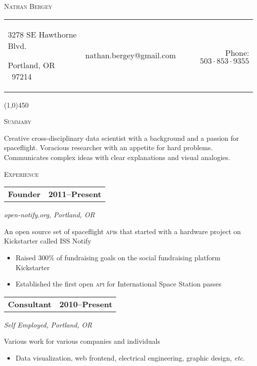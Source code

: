 \documentclass[letterpaper,10pt]{article}
\makeatletter
\newcommand{\me}      {Nathan Bergey}
\newcommand{\email}   {nathan.bergey@gmail.com}
\newcommand{\address} {\begin{minipage}{2in}\raggedright3278 SE Hawthorne Blvd.\par Portland, OR \ 97214\end{minipage}}
\newcommand{\phone}   {$503\cdot853\cdot9355$}
\newcommand{\resumepageheader}{
  \begin{center}
    {\LARGE{\textsc{\me}}}

    \vspace{0.2in}

    \begin{tabular*}{6.5in}{l c@{\extracolsep{\fill}} r}
      \address & \email & Phone: \phone \\
    \end{tabular*}
    
    \vspace{0.02in}

    \line(1,0){450}
  \end{center}
}
\newcommand{\resumestatement}[1]{
  \vspace{0.05in}
  \textsc{\Large Summary}
  \vspace{0.1in}
  \begin{center}
    \begin{minipage}{5.5in}
      \small
      #1
    \end{minipage}
  \end{center}
}
\newcommand{\resumeheader}[1]{
  \vspace{0.08in}
  \textsc{\Large #1}
  \vspace{0.10in}
}
\newcommand{\resumeitem}[4]{
  {\addtolength{\leftskip}{0.21in}
    \begin{tabular*}{6.25in}{l@{\extracolsep{\fill}} r}
      {\textbf{#1}} & {\textbf{#2}} \\
    \end{tabular*}
    
  }
  
  \vspace{0.01in}
  {\addtolength{\leftskip}{0.3in}
    \textit{#3}\par
  }
  
  \vspace{0.07in}
  {\addtolength{\leftskip}{0.3in}
    \small
    \begin{minipage}{5in}
      #4
    \end{minipage}
    
  }
  \vspace{0.15in}
}
\makeatother
\begin{document}
\resumepageheader

\resumestatement{
                  Creative cross-disciplinary data scientist with a background 
                  and a passion for spaceflight. Voracious researcher with an 
                  appetite for hard problems. Communicates complex ideas with 
                  clear explanations and visual analogies.
                }

\resumeheader{Experience}
           
\resumeitem{Founder}{2011--Present}%
           {open-notify.org, Portland, OR}%
           {
              An open source set of spaceflight \textsc{api}s that started with a 
              hardware project on Kickstarter called ISS Notify
              \begin{itemize}[topsep=1pt, itemsep=0pt, parsep=0pt]
                \renewcommand{\labelitemi}{---}
                \item Raised 300\% of fundraising goals on the social fundraising platform Kickstarter
                \item Established the first open \textsc{api} for International Space Station passes
              \end{itemize}
           }

\resumeitem{Consultant}{2010--Present}%
           {Self Employed, Portland, OR}%
           {
              Various work for various companies and individuals
              \begin{itemize}[topsep=1pt, itemsep=0pt, parsep=0pt]
                \renewcommand{\labelitemi}{---}
                \item Data visualization, web frontend, electrical engineering, graphic design, \textit{etc}.
              \end{itemize}
           }
\end{document}
